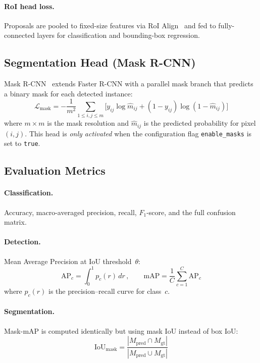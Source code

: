 \documentclass[11pt,a4paper]{article}
\begin{document}
\paragraph{RoI head loss.}  Proposals are pooled to fixed-size features via
RoI Align~\cite{he2017mask} and fed to fully-connected layers for
classification and bounding-box regression.

\subsection{Segmentation Head (Mask R-CNN)}

Mask R-CNN~\cite{he2017mask} extends Faster R-CNN with a parallel mask
branch that predicts a binary mask for each detected instance:
\begin{equation}
  \mathcal{L}_{\text{mask}} =
    -\frac{1}{m^2}\sum_{1\le i,j\le m}
    \bigl[y_{ij}\log\hat{m}_{ij}
          + (1-y_{ij})\log(1-\hat{m}_{ij})\bigr]
  \label{eq:mask}
\end{equation}
where $m\times m$ is the mask resolution and $\hat{m}_{ij}$ is the predicted
probability for pixel $(i,j)$.  This head is \emph{only activated} when the
configuration flag \texttt{enable\_masks} is set to \texttt{true}.

\subsection{Evaluation Metrics}

\paragraph{Classification.}  Accuracy, macro-averaged precision, recall,
$F_1$-score, and the full confusion matrix.

\paragraph{Detection.}  Mean Average Precision at IoU threshold~$\theta$:
\begin{equation}
  \text{AP}_c = \int_0^1 p_c(r)\,dr\,,
  \qquad
  \text{mAP} = \frac{1}{C}\sum_{c=1}^{C}\text{AP}_c
  \label{eq:map}
\end{equation}
where $p_c(r)$ is the precision--recall curve for class~$c$.

\paragraph{Segmentation.}  Mask-mAP is computed identically but using mask
IoU instead of box IoU:
\begin{equation}
  \text{IoU}_{\text{mask}} =
    \frac{|M_{\text{pred}} \cap M_{\text{gt}}|}
         {|M_{\text{pred}} \cup M_{\text{gt}}|}
  \label{eq:mask_iou}
\end{equation}
\end{document}
